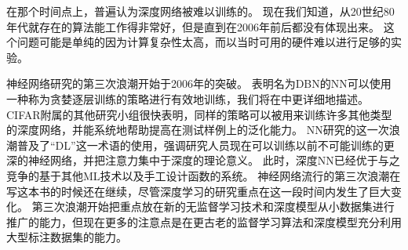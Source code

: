
在那个时间点上，普遍认为深度网络被难以训练的。
现在我们知道，从20世纪80年代就存在的算法能工作得非常好，但是直到在2006年前后都没有体现出来。
这个问题可能是单纯的因为计算复杂性太高，而以当时可用的硬件难以进行足够的实验。

神经网络研究的第三次浪潮开始于2006年的突破。
表明名为\gls{DBN}的\gls{NN}可以使用一种称为贪婪逐层训练的策略进行有效地训练\citep{Hinton06}，我们将在中更详细地描述。
CIFAR附属的其他研究小组很快表明，同样的策略可以被用来训练许多其他类型的深度网络\citep{Bengio+Lecun-chapter2007-small,ranzato-07}，并能系统地帮助提高在测试样例上的泛化能力。
\gls{NN}研究的这一次浪潮普及了``\gls{DL}''这一术语的使用，强调研究人员现在可以训练以前不可能训练的更深的神经网络，并把注意力集中于深度的理论意义\citep{Bengio+Lecun-chapter2007,Delalleau+Bengio-2011-small,Pascanu-et-al-ICLR2014,Montufar-et-al-NIPS2014}。
此时，深度\gls{NN}已经优于与之竞争的基于其他\gls{ML}技术以及手工设计函数的系统。
神经网络流行的第三次浪潮在写这本书的时候还在继续，尽管深度学习的研究重点在这一段时间内发生了巨大变化。
第三次浪潮开始把重点放在新的无监督学习技术和深度模型从小数据集进行推广的能力，但现在更多的注意点是在更古老的监督学习算法和深度模型充分利用大型标注数据集的能力。

